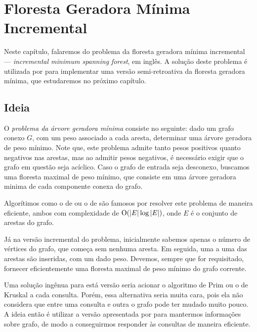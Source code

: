 
\chapter{Floresta Geradora Mínima Incremental}
\label{cap:incremental-msf}

Neste capítulo, falaremos do problema da floresta geradora mínima incremental --- \emph{incremental minimum spanning forest}, em inglês. A solução deste problema é utilizada por \citet{10.1093/comjnl/bxaa135} para implementar uma versão semi-retroativa da floresta geradora mínima, que estudaremos no próximo capítulo.

\section{Ideia}
\label{sec:imsf-ideia}

O \emph{problema da árvore geradora mínima} consiste no seguinte: dado um grafo conexo $G$, com um peso associado a cada aresta, determinar uma árvore geradora de peso mínimo. Note que, este problema admite tanto pesos positivos quanto negativos nas arestas, mas ao admitir pesos negativos, é necessário exigir que o grafo em questão seja acíclico. Caso o grafo de entrada seja desconexo, buscamos uma floresta maximal de peso mínimo, que consiste em uma árvore geradora minima de cada componente conexa do grafo.

Algorítimos como o de \citet{6773228} ou o de \citet{kruskal1956shortest} são famosos por resolver este problema de maneira eficiente, ambos com complexidade de $\mathrm{O}(|E| \log |E|)$, onde $E$ é o conjunto de arestas do grafo.

Já na versão incremental do problema, inicialmente sabemos apenas o número de vértices do grafo, que começa sem nenhuma aresta. Em seguida, uma a uma das arestas são inseridas, com um dado peso. Devemos, sempre que for requisitado, fornecer eficientemente uma floresta maximal de peso mínimo do grafo corrente.

Uma solução ingênua para está versão seria acionar o algoritmo de Prim ou o de Kruskal a cada consulta. Porém, essa alternativa seria muita cara, pois ela não considera que entre uma consulta e outra o grafo pode ter mudado muito pouco. A ideia então é utilizar a versão apresentada por \citet{frederickson1985data} para mantermos informações sobre grafo, de modo a conseguirmos responder às consultas de maneira eficiente.

